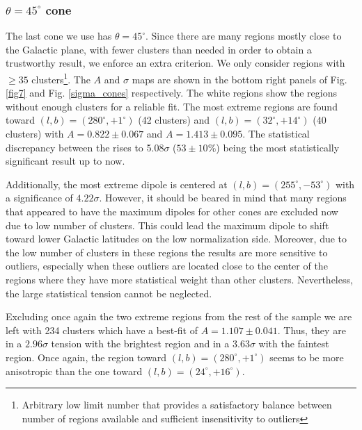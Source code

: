 \documentclass{aa}   %
\begin{document}
\subsubsection{$\theta=45^{\circ}$ cone}

The last cone we use has $\theta=45^{\circ}$. Since there are many regions mostly close to the Galactic plane, with fewer clusters than needed in order to obtain a trustworthy result, we enforce an extra criterion. We only consider regions with $\geq 35$ clusters\footnote{Arbitrary low limit number that provides a satisfactory balance between number of regions available and sufficient insensitivity to outliers}. The $A$ and $\sigma$ maps are shown in the bottom right panels of Fig. \ref{fig7} and Fig. \ref{sigma_cones} respectively. The white regions show the regions without enough clusters for a reliable fit. The most extreme regions are found toward $(l,b)=(280^{\circ}, +1^{\circ})$ (42 clusters) and $(l,b)=(32^{\circ}, +14^{\circ})$ (40 clusters) with $A=0.822\pm 0.067$ and $A=1.413\pm 0.095$. The statistical discrepancy between the rises to 5.08$\sigma$ ($53\pm 10\%$) being the most statistically significant result up to now. 

Additionally, the most extreme dipole is centered at $(l,b)=(255^{\circ}, -53^{\circ})$ with a significance of $4.22\sigma$. However, it should be beared in mind that many regions that appeared to have the maximum dipoles for other cones are excluded now due to low number of clusters. This could lead the maximum dipole to shift toward lower Galactic latitudes on the low normalization side. Moreover, due to the low number of clusters in these regions the results are more sensitive to outliers, especially when these outliers are located close to the center of the regions where they have more statistical weight than other clusters. Nevertheless, the large statistical tension cannot be neglected.


Excluding once again the two extreme regions from the rest of the sample we are left with 234 clusters which have a best-fit of $A=1.107\pm 0.041$. Thus, they are in a $2.96\sigma$ tension with the brightest region and in a $3.63\sigma$ with the faintest region. Once again, the region toward $(l,b)=(280^{\circ}, +1^{\circ})$ seems to be more anisotropic than the one toward $(l,b)=(24^{\circ}, +16^{\circ})$.
\end{document}
